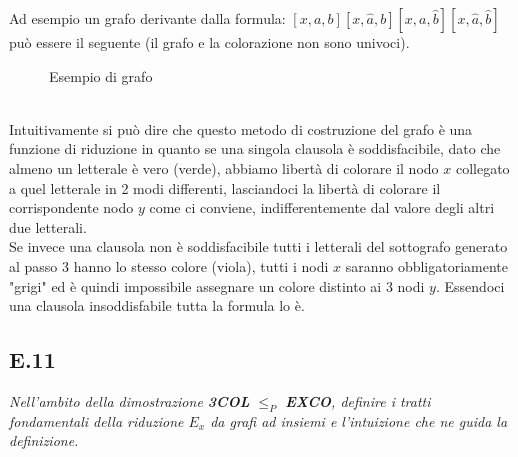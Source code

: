 \documentclass[a4paper]{article}
\begin{document}
Ad esempio un grafo derivante dalla formula: $[x,a,b][x,\hat a, b][x,a,\hat b][x, \hat a, \hat b]$ può essere il seguente (il grafo e la colorazione non sono univoci).
		\begin{figure}[!ht]
		\centering
		\caption{Esempio di grafo} \label{FIG:E10_finale}
		\end{figure}\\
Intuitivamente si può dire che questo metodo di costruzione del grafo è una funzione di riduzione in quanto se una singola clausola è soddisfacibile, dato che almeno un letterale è vero (verde), abbiamo libertà di colorare il nodo $x$ collegato a quel letterale in 2 modi differenti, lasciandoci la libertà di colorare il corrispondente nodo $y$ come ci conviene, indifferentemente dal valore degli altri due letterali.\\
Se invece una clausola non è soddisfacibile tutti i letterali del sottografo generato al passo 3 hanno lo stesso colore (viola), tutti i nodi $x$ saranno obbligatoriamente "grigi" ed è quindi impossibile assegnare un colore distinto ai 3 nodi $y$.
Essendoci una clausola insoddisfabile tutta la formula lo è.
\subsection{E.11}
\emph{Nell’ambito della dimostrazione \textbf{3COL} $\leq_P$ \textbf{EXCO}, definire i tratti fondamentali della riduzione $E_x$ da grafi ad insiemi e l’intuizione che ne guida la definizione.}
\end{document}
